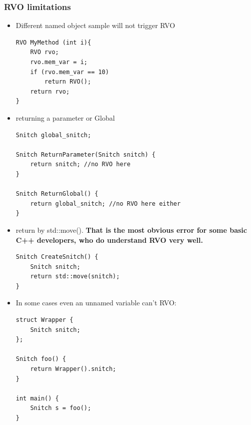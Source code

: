 \documentclass[a4paper,11pt,twoside]{book}
\begin{document}
\subsubsection{RVO limitations}
\begin{itemize}
	\item Different named object sample will not trigger RVO
\begin{lstlisting}[numbers=none]
RVO MyMethod (int i){
	RVO rvo;
	rvo.mem_var = i;
	if (rvo.mem_var == 10)
		return RVO();
	return rvo; 
}
\end{lstlisting}
	
	\item returning a parameter or Global
\begin{lstlisting}[numbers=none]
Snitch global_snitch;

Snitch ReturnParameter(Snitch snitch) {
	return snitch; //no RVO here
}

Snitch ReturnGlobal() {
	return global_snitch; //no RVO here either
}
\end{lstlisting}

\item return by std::move(). \textbf{That is the most obvious error for some basic C++ developers, who do understand RVO very well.} 
\begin{lstlisting}[numbers=none]
Snitch CreateSnitch() {
	Snitch snitch;
	return std::move(snitch);
}
\end{lstlisting}
	
\item In some cases even an unnamed variable can't RVO:
\begin{lstlisting}[numbers=none]
struct Wrapper {
	Snitch snitch;
};

Snitch foo() {
	return Wrapper().snitch;
}

int main() {
	Snitch s = foo();
}
\end{lstlisting}

\end{itemize}
\end{document}

